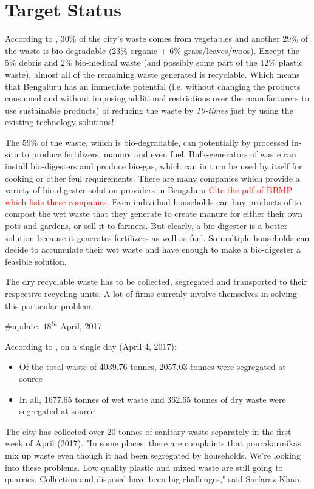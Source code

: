 \documentclass[10pt]{article}
\begin{document}
\section{Target Status}

According to \cite{BBMP:cityStatistics}, 30\% of the city's waste comes from vegetables and another 29\% of the waste is bio-degradable (23\% organic + 6\% grass/leaves/woos). Except the 5\% debris and 2\% bio-medical waste (and possibly some part of the 12\% plastic waste), almost all of the remaining waste generated is recyclable. Which means that Bengaluru has an immediate potential (i.e. without changing the products consumed and without imposing additional restrictions over the manufacturers to use sustainable products) of reducing the waste by \emph{10-times} just by using the existing technology solutions!

The 59\% of the waste, which is bio-degradable, can potentially by processed in-situ to produce fertilizers, manure and even fuel. Bulk-generators of waste can install bio-digesters and produce bio-gas, which can in turn be used by itself for cooking or other feul requirements. There are many companies which provide a variety of bio-digester solution providers in Bengaluru \textcolor{red}{Cite the pdf of BBMP which lists these companies}. Even individual households can buy products of \cite{DailyDump:about} to compost the wet waste that they generate to create manure for either their own pots and gardens, or sell it to farmers. But clearly, a bio-digester is a better solution because it generates fertilizers as well as fuel. So multiple households can decide to accumulate their wet waste and have enough to make a bio-digester a feasible solution.

The dry recyclable waste has to be collected, segregated and transported to their respective recycling units. A lot of firms currenly involve themselves in solving this particular problem. 

\#update: $18^{th}$ April, 2017

According to \cite{ToI:segregation_at_source}, on a single day (April 4, 2017):
\begin{itemize}
	\item Of the total waste of 4039.76 tonnes, 2057.03 tonnes were segregated at source
	\item In all, 1677.65 tonnes of wet waste and 362.65 tonnes of dry waste were segregated at source
\end{itemize}
The city has collected over 20 tonnes of sanitary waste separately in the first week of April (2017).
 "In some places, there are complaints that pourakarmikas mix up waste even though it had been segregated by households. We're looking into these problems. Low quality plastic and mixed waste are still going to quarries. Collection and disposal have been big challenges," said Sarfaraz Khan.





\end{document}

